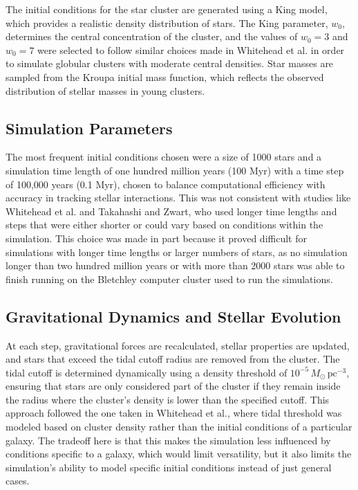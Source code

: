 \documentclass[10pt,twocolumn]{article}
\begin{document}
The initial conditions for the star cluster are generated using a King model, which provides a realistic density distribution of stars. The King parameter, $w_0$, determines the central concentration of the cluster, and the values of $w_0 = 3$ and $w_0 = 7$ were selected to follow similar choices made in Whitehead et al. in order to simulate globular clusters with moderate central densities. Star masses are sampled from the Kroupa initial mass function, which reflects the observed distribution of stellar masses in young clusters.

\subsection{Simulation Parameters}

The most frequent initial conditions chosen were a size of 1000 stars and a simulation time length of one hundred million years (100 Myr) with a time step of 100,000 years (0.1 Myr), chosen to balance computational efficiency with accuracy in tracking stellar interactions. This was not consistent with studies like Whitehead et al. and Takahashi and Zwart, who used longer time lengths and steps that were either shorter or could vary based on conditions within the simulation. This choice was made in part because it proved difficult for simulations with longer time lengths or larger numbers of stars, as no simulation longer than two hundred million years or with more than 2000 stars was able to finish running on the Bletchley computer cluster used to run the simulations.

\subsection{Gravitational Dynamics and Stellar Evolution}

At each step, gravitational forces are recalculated, stellar properties are updated, and stars that exceed the tidal cutoff radius are removed from the cluster. The tidal cutoff is determined dynamically using a density threshold of $10^{-5}\,M_{\odot}\,\text{pc}^{-3}$, ensuring that stars are only considered part of the cluster if they remain inside the radius where the cluster’s density is lower than the specified cutoff. This approach followed the one taken in Whitehead et al., where tidal threshold was modeled based on cluster density rather than the initial conditions of a particular galaxy. The tradeoff here is that this makes the simulation less influenced by conditions specific to a galaxy, which would limit versatility, but it also limits the simulation’s ability to model specific initial conditions instead of just general cases.
\end{document}
